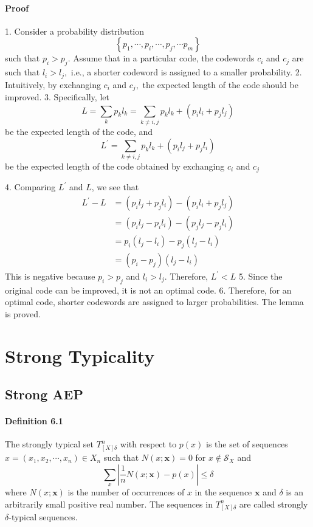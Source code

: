 \documentclass[8pt]{article}
\begin{document}
\paragraph{Proof}
1. Consider a probability distribution
$$
\left\{p_{1}, \cdots, p_{i}, \cdots, p_{j}, \cdots p_{m}\right\}
$$
such that $p_{i}>p_{j}$. Assume that in a particular code, the codewords $c_{i}$ and $c_{j}$ are such that $l_{i}>l_{j},$ i.e., a shorter codeword is assigned to a smaller probability.
2. Intuitively, by exchanging $c_{i}$ and $c_{j},$ the expected length of the code should be improved.
3. Specifically, let
$$
L=\sum_{k} p_{k} l_{k}=\sum_{k \neq i, j} p_{k} l_{k}+\left(p_{i} l_{i}+p_{j} l_{j}\right)
$$
be the expected length of the code, and
$$
L^{\prime}=\sum_{k \neq i, j} p_{k} l_{k}+\left(p_{i} l_{j}+p_{j} l_{i}\right)
$$
be the expected length of the code obtained by exchanging $c_{i}$ and $c_{j}$

4. Comparing $L^{\prime}$ and $L$, we see that
$$
\begin{aligned}
L^{\prime}-L &=\left(p_{i} l_{j}+p_{j} l_{i}\right)-\left(p_{i} l_{i}+p_{j} l_{j}\right) \\
&=\left(p_{i} l_{j}-p_{i} l_{i}\right)-\left(p_{j} l_{j}-p_{j} l_{i}\right) \\
&=p_{i}\left(l_{j}-l_{i}\right)-p_{j}\left(l_{j}-l_{i}\right) \\
&=\left(p_{i}-p_{j}\right)\left(l_{j}-l_{i}\right)
\end{aligned}
$$
This is negative because $p_{i}>p_{j}$ and $l_{i}>l_{j} .$ Therefore, $L^{\prime}<L$
5. Since the original code can be improved, it is not an optimal code.
6. Therefore, for an optimal code, shorter codewords are assigned to larger probabilities. The lemma is proved.

\newpage
\section{Strong Typicality}
\subsection{Strong AEP}
\begin{tcolorbox}
\paragraph{Definition 6.1}  The strongly typical set $T_{[X] \delta}^{n}$ with respect to $p(x)$ is the set
of sequences $x = (x_1,x_2, \cdots  ,x_n) \in X_n$ such that $N(x ; \mathbf{x})=0$ for $x \notin \mathcal{S}_{X}$ and
\begin{equation}
	\sum_{x}\left|\frac{1}{n} N(x ; \mathbf{x})-p(x)\right| \leq \delta
\end{equation}
where $N(x ; \mathbf{x})$ is the number of occurrences of $x$ in the sequence $ \mathbf{x}$ and $\delta$ is an arbitrarily small positive real number. The sequences in $T_{[X] \delta}^{n}$ are called
strongly $\delta$-typical sequences.
\end{tcolorbox}
\end{document}
